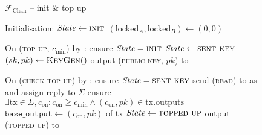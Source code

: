 \begin{figure}[H]
  \begin{systembox}{$\mathcal{F}_{\mathrm{Chan}}$ -- init \& top up}
    \begin{algorithmic}[1]
      \State Initialisation: 
      \Indent
        \State $\mathit{State} \gets \textsc{init}$
        \State $(\mathrm{locked}_A, \mathrm{locked}_B) \gets (0, 0)$
      \EndIndent
      \Statex

      \State On (\textsc{top up}, $c_{\mathrm{min}}$) by \alice:
      \label{code:functionality:chan:skeleton:init:top_up:start}
      \Indent
        \State ensure $\mathit{State} = \textsc{init}$
        \State $\mathit{State} \gets \textsc{sent key}$
        \State $(sk, pk) \gets \textsc{KeyGen}()$
        \State output (\textsc{public key}, $pk$) to \alice
        \label{code:functionality:chan:skeleton:init:top_up:end}
      \EndIndent
      \Statex

      \State On (\textsc{check top up}) by \alice:
      \label{code:functionality:chan:skeleton:init:check_top_up:start}
      \Indent
        \State ensure $\mathit{State} = \textsc{sent key}$
        \State send (\textsc{read}) to \ledger as \alice and assign reply to
        $\Sigma$
        \State ensure $\exists \mathrm{tx} \in \Sigma, c_{\mathrm{on}}:
        c_{\mathrm{on}} \geq c_{\mathrm{min}} \wedge (c_{\mathrm{on}}, pk) \in
        \mathrm{tx.outputs}$
        \State $\mathtt{base\_output} \gets (c_{\mathrm{on}}, pk) \text{ of tx}$
        \State $\mathit{State} \gets \textsc{topped up}$
        \State output (\textsc{topped up}) to \alice
        \label{code:functionality:chan:skeleton:init:check_top_up:end}
      \EndIndent
    \end{algorithmic}
  \end{systembox}
  \caption{}
  \label{code:functionality:chan:skeleton:init}
\end{figure}

